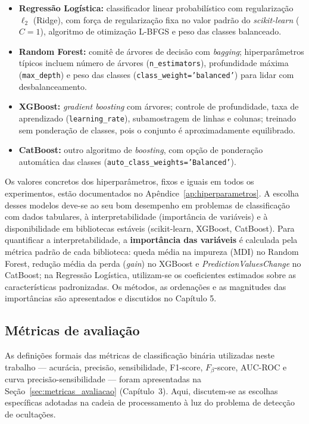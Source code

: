 \begin{itemize}
	\item \textbf{Regressão Logística:} classificador linear probabilístico com regularização \(\ell_2\) (Ridge), com força de regularização fixa no valor padrão do \textit{scikit-learn} (\(C = 1\)), algoritmo de otimização L-BFGS e peso das classes balanceado.
	\item \textbf{Random Forest:} comitê de árvores de decisão com \textit{bagging}; hiperparâmetros típicos incluem número de árvores (\texttt{n\_estimators}), profundidade máxima (\texttt{max\_depth}) e peso das classes (\texttt{class\_weight='balanced'}) para lidar com desbalanceamento.
	\item \textbf{XGBoost:} \textit{gradient boosting} com árvores; controle de profundidade, taxa de aprendizado (\texttt{learning\_rate}), subamostragem de linhas e colunas; treinado sem ponderação de classes, pois o conjunto é aproximadamente equilibrado.
	\item \textbf{CatBoost:} outro algoritmo de \textit{boosting}, com opção de ponderação automática das classes (\texttt{auto\_class\_weights='Balanced'}).
\end{itemize}

Os valores concretos dos hiperparâmetros, fixos e iguais em todos os experimentos, estão documentados no Apêndice~\ref{ap:hiperparametros}. A escolha desses modelos deve-se ao seu bom desempenho em problemas de classificação com dados tabulares, à interpretabilidade (importância de variáveis) e à disponibilidade em bibliotecas estáveis (scikit-learn, XGBoost, CatBoost). Para quantificar a interpretabilidade, a \textbf{importância das variáveis} é calculada pela métrica padrão de cada biblioteca: queda média na impureza (MDI) no Random Forest, redução média da perda (\textit{gain}) no XGBoost e \textit{PredictionValuesChange} no CatBoost; na Regressão Logística, utilizam-se os coeficientes estimados sobre as características padronizadas. Os métodos, as ordenações e as magnitudes das importâncias são apresentados e discutidos no Capítulo 5.

\subsection{Métricas de avaliação}

As definições formais das métricas de classificação binária utilizadas neste trabalho --- acurácia, precisão, sensibilidade, F1-score, $F_\beta$-score, AUC-ROC e curva precisão-sensibilidade --- foram apresentadas na Seção~\ref{sec:metricas_avaliacao} (Capítulo~3). Aqui, discutem-se as escolhas específicas adotadas na cadeia de processamento à luz do problema de detecção de ocultações.

